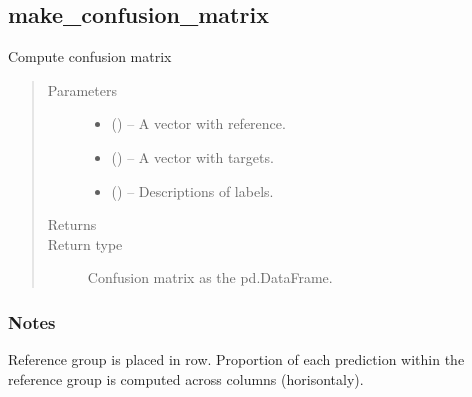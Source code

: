 \documentclass[letterpaper,10pt,english]{sphinxmanual}
\begin{document}
\subsection{make\_confusion\_matrix}
\label{\detokenize{api/ucf.make_confusion_matrix:make-confusion-matrix}}\label{\detokenize{api/ucf.make_confusion_matrix::doc}}

\begin{fulllineitems}
\label{\detokenize{api/ucf.make_confusion_matrix:ucf.make_confusion_matrix}}
Compute confusion matrix
\begin{quote}\begin{description}
\item[{Parameters}] \leavevmode\begin{itemize}
\item {} 
 () -- A vector with reference.

\item {} 
 () -- A vector with targets.

\item {} 
 () -- Descriptions of labels.

\end{itemize}

\item[{Returns}] \leavevmode


\item[{Return type}] \leavevmode
Confusion matrix as the pd.DataFrame.

\end{description}\end{quote}
\subsubsection*{Notes}

Reference group is placed in row. Proportion of each prediction
within the reference group is computed across columns (horisontaly).

\end{fulllineitems}
\end{document}
